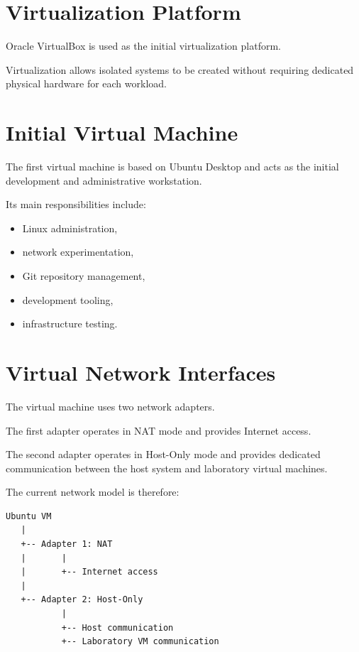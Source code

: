 \section{Virtualization Platform}

Oracle VirtualBox is used as the initial virtualization platform.

Virtualization allows isolated systems to be created without requiring
dedicated physical hardware for each workload.

\section{Initial Virtual Machine}

The first virtual machine is based on Ubuntu Desktop and acts as the initial
development and administrative workstation.

Its main responsibilities include:

\begin{itemize}
    \item Linux administration,
    \item network experimentation,
    \item Git repository management,
    \item development tooling,
    \item infrastructure testing.
\end{itemize}

\section{Virtual Network Interfaces}

The virtual machine uses two network adapters.

The first adapter operates in NAT mode and provides Internet access.

The second adapter operates in Host-Only mode and provides dedicated
communication between the host system and laboratory virtual machines.

\newpage
The current network model is therefore:

\begin{verbatim}
Ubuntu VM
   |
   +-- Adapter 1: NAT
   |       |
   |       +-- Internet access
   |
   +-- Adapter 2: Host-Only
           |
           +-- Host communication
           +-- Laboratory VM communication
\end{verbatim}